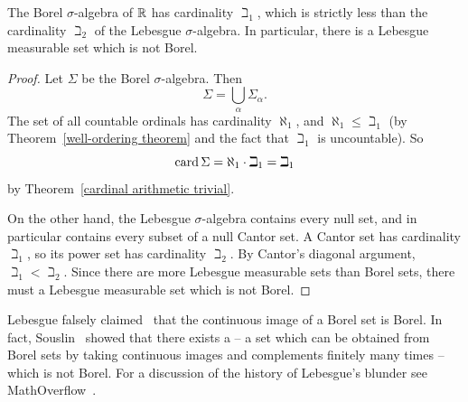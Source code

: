 \begin{theorem}\label{Borel not Lebesgue}
The Borel $\sigma$-algebra of $\mathbb{R}$ has cardinality $\beth_{1}$, which is strictly less than the cardinality $\beth_{2}$ of the Lebesgue $\sigma$-algebra.
In particular, there is a Lebesgue measurable set which is not Borel.
\end{theorem}
\begin{proof}
Let $\Sigma$ be the Borel $\sigma$-algebra. Then
$$\Sigma = \bigcup_{\alpha} \Sigma_{\alpha}.$$
The set of all countable ordinals has cardinality $\aleph_{1}$, and $\aleph_{1} \leq \beth_{1}$ (by Theorem~\ref{well-ordering theorem} and the fact that $\beth_{1}$ is uncountable).
So
$$\operatorname{card} \Sigma = \aleph_{1} \cdot \beth_{1} = \beth_{1}$$
by Theorem~\ref{cardinal arithmetic trivial}.

On the other hand, the Lebesgue $\sigma$-algebra contains every null set, and in particular contains every subset of a null Cantor set.
A Cantor set has cardinality $\beth_{1}$, so its power set has cardinality $\beth_{2}$.
By Cantor's diagonal argument, $\beth_{1} < \beth_{2}$.
Since there are more Lebesgue measurable sets than Borel sets, there must a Lebesgue measurable set which is not Borel.
\end{proof}

\begin{subsec}
Lebesgue falsely claimed~\cite{Lebesgue1905} that the continuous image of a Borel set is Borel.
In fact, Souslin~\cite{Souslin1917} showed that there exists a  -- a set which can be obtained from Borel sets by taking continuous images and complements finitely many times -- which is not Borel.
For a discussion of the history of Lebesgue's blunder see MathOverflow~\cite{MO34142}.
\end{subsec}

